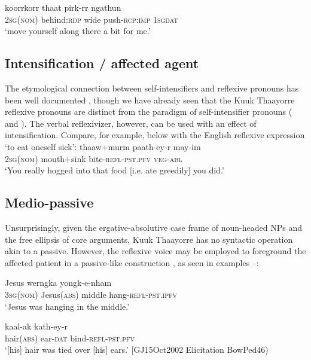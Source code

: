 \documentclass[output=paper]{langscibook}
\begin{document}
\ea 
    \label{ex:Gaby:26}
      {koorrkorr}  {thaat}  {pirk-rr}  {ngathun}\\
    \textsc{2sg}(\textsc{nom})  behind\textsc{:rdp}  wide  push-\textsc{rcp:imp}  \textsc{1sg}\textsc{dat}\\
    \glt ‘move yourself along there a bit for me.’ \citep[446]{Hall1972}
    \z
    

\subsection{Intensification / affected agent}
\label{sec:Gaby:4.4}
The etymological connection between self-intensifiers and reflexive pronouns has been well documented \citep{Faltz1985, KoenigSiemund2000}, though we have already seen that the Kuuk Thaayorre reflexive pronouns are distinct from the paradigm of self-intensifier pronouns ( and ). The verbal reflexivizer, however, can be used with an effect of intensification. Compare, for example,  below with the English reflexive expression ‘to eat oneself sick’:
\ea 
    \label{ex:Gaby:27}
      {thaaw+murm}  {paath-ey-r}  {may-im}
\\
     \textsc{2sg}(\textsc{nom)}  mouth+sink  bite-\textsc{refl-pst.pfv}  \textsc{veg-abl}\\
    \glt  ‘You really hogged into that food [i.e. ate greedily] you did.’ \citep[504]{Hall1972}
    \z
    
\subsection{Medio-passive}
\label{sec:Gaby:4.5}
Unsurprisingly, given the ergative-absolutive case frame of noun-headed NPs and the free ellipsis of core arguments, Kuuk Thaayorre has no syntactic operation akin to a passive. However, the reflexive voice may be employed to foreground the affected patient in a passive-like construction \citep{Geniuisiene1987,  Kemmer1993}, as seen in examples --:

\ea 
    \label{ex:Gaby:28}
      {Jesus}  {werngka}  {yongk-e-nham}\\
    \textsc{3sg}(\textsc{nom})  Jesus(\textsc{abs})  middle  hang-\textsc{refl-pst.ipfv}\\
    \glt ‘Jesus was hanging in the middle.’ \citep[137]{Hall1972}
    \z
    
 
\ea 
    \label{ex:Gaby:29}
      {kaal-ak}  {kath-ey-r}\\
     hair(\textsc{abs})  ear-\textsc{dat}  bind-\textsc{refl-pst.pfv}\\
    \glt ‘[his] hair was tied over [his] ears.’ [GJ15Oct2002 Elicitation BowPed46)
    \z
\end{document}
